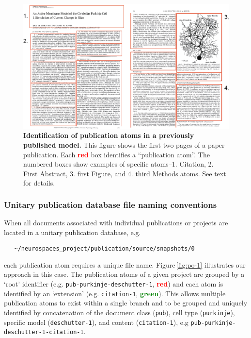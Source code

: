 \documentclass[12pt]{article}
\begin{document}
\begin{figure}[h]
  \centering
   \includegraphics[scale=0.3]{figures/pub-manual-atoms-3.eps}
\caption{{\bf Identification of publication atoms in a previously published model.} This figure shows the first two pages of a paper publication. Each {\textcolor{red}{\bf red}} box identifies a ``publication atom''. The numbered boxes show examples of specific atoms--1. Citation, 2. First Abstract, 3. first Figure, and 4. third Methods atoms. See text for details.}
  \label{fig:po-2}
\end{figure}

\subsubsection*{Unitary publication database file naming conventions}

When all documents associated with individual publications or projects are located in a unitary publication database, e.g. 
\begin{verbatim}
   ~/neurospaces_project/publication/source/snapshots/0
\end{verbatim}   
each publication atom requires a unique file name. Figure\,\ref{fig:po-1} illustrates our approach in this case. The publication atoms of a given project are grouped by a `root'  identifier (e.g. {\tt pub-purkinje-deschutter-1}, {\textcolor{red}{\bf red}}) and each atom is identified by an `extension' (e.g. {\tt citation-1}, {\textcolor{green}{\bf green}}). This allows multiple publication atoms to exist within a single branch and to be grouped and uniquely identified by concatenation of the document class ({\tt pub}), cell type ({\tt purkinje}), specific model ({\tt deschutter-1}), and content ({\tt citation-1}), e.g {\tt pub-purkinje-deschutter-1-citation-1}.
\end{document}
